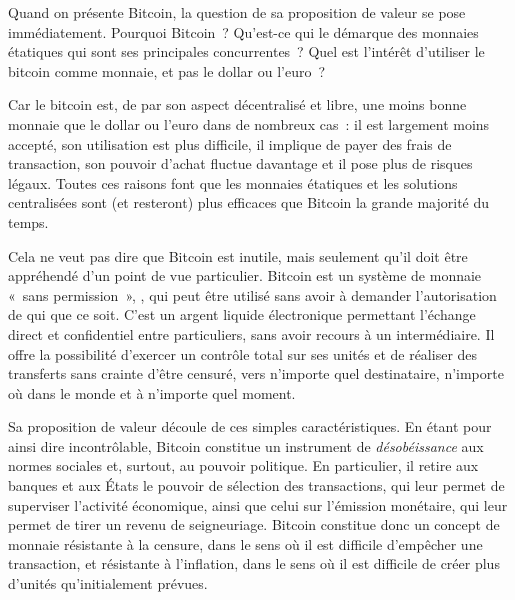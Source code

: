 Quand on présente Bitcoin, la question de sa proposition de valeur se pose immédiatement. Pourquoi Bitcoin~? Qu'est-ce qui le démarque des monnaies étatiques qui sont ses principales concurrentes~? Quel est l'intérêt d'utiliser le bitcoin comme monnaie, et pas le dollar ou l'euro~?

Car le bitcoin est, de par son aspect décentralisé et libre, une moins bonne monnaie que le dollar ou l'euro dans de nombreux cas~: il est largement moins accepté, son utilisation est plus difficile, il implique de payer des frais de transaction, son pouvoir d'achat fluctue davantage et il pose plus de risques légaux. Toutes ces raisons font que les monnaies étatiques et les solutions centralisées sont (et resteront) plus efficaces que Bitcoin la grande majorité du temps.

Cela ne veut pas dire que Bitcoin est inutile, mais seulement qu'il doit être appréhendé d'un point de vue particulier. Bitcoin est un système de monnaie «~sans permission~», , qui peut être utilisé sans avoir à demander l'autorisation de qui que ce soit. C'est un argent liquide électronique permettant l'échange direct et confidentiel entre particuliers, sans avoir recours à un intermédiaire. Il offre la possibilité d'exercer un contrôle total sur ses unités et de réaliser des transferts sans crainte d'être censuré, vers n'importe quel destinataire, n'importe où dans le monde et à n'importe quel moment.

Sa proposition de valeur découle de ces simples caractéristiques. En étant pour ainsi dire incontrôlable, Bitcoin constitue un instrument de \emph{désobéissance} aux normes sociales et, surtout, au pouvoir politique. En particulier, il retire aux banques et aux États le pouvoir de sélection des transactions, qui leur permet de superviser l'activité économique, ainsi que celui sur l'émission monétaire, qui leur permet de tirer un revenu de seigneuriage. Bitcoin constitue donc un concept de monnaie résistante à la censure, dans le sens où il est difficile d'empêcher une transaction, et résistante à l'inflation, dans le sens où il est difficile de créer plus d'unités qu'initialement prévues.


